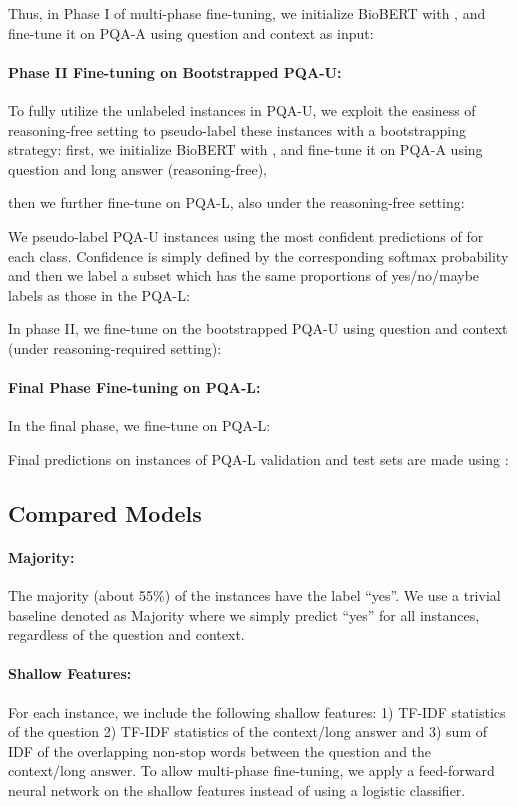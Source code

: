 \documentclass[11pt,a4paper]{article}
\begin{document}
Thus, in Phase I of multi-phase fine-tuning, we initialize BioBERT with , and fine-tune it on PQA-A using question and context as input:


\paragraph{Phase II Fine-tuning on Bootstrapped PQA-U:}
To fully utilize the unlabeled instances in PQA-U, we exploit the easiness of reasoning-free setting to pseudo-label these instances with a bootstrapping strategy: first, we initialize BioBERT with , and fine-tune it on PQA-A using question and long answer (reasoning-free), 


then we further fine-tune  on PQA-L, also under the reasoning-free setting:


We pseudo-label PQA-U instances using the most confident predictions of  for each class. Confidence is simply defined by the corresponding softmax probability and then we label a subset which has the same proportions of yes/no/maybe labels as those in the PQA-L:


In phase II, we fine-tune  on the bootstrapped PQA-U using question and context (under reasoning-required setting):


\paragraph{Final Phase Fine-tuning on PQA-L:}
In the final phase, we fine-tune  on PQA-L:


Final predictions on instances of PQA-L validation and test sets are made using :


\subsection{Compared Models}
\paragraph{Majority:} The majority (about 55\%) of the instances have the label ``yes''. We use a trivial baseline denoted as Majority where we simply predict ``yes'' for all instances, regardless of the question and context.

\paragraph{Shallow Features:} For each instance, we include the following shallow features: 1) TF-IDF statistics of the question 2) TF-IDF statistics of the context/long answer and 3) sum of IDF of the overlapping non-stop words between the question and the context/long answer. To allow multi-phase fine-tuning, we apply a feed-forward neural network on the shallow features instead of using a logistic classifier.
\end{document}
